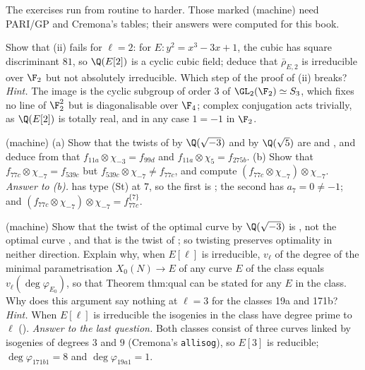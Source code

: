 The exercises run from routine to harder. Those marked (machine) need PARI/GP and Cremona's tables; their answers were computed for this book.

\begin{exercise}[$\ell=2$]\label{exer:modgalrep:l-two}
Show that (ii) fails for $\ell=2$: for $E\colon y^2=x^3-3x+1$, the cubic has square discriminant $81$, so $\Q(E[2])$ is a cyclic cubic field; deduce that
$\bar\rho_{E,2}$ is irreducible over $\F_2$ but not absolutely irreducible. Which step of the proof of (ii) breaks?
\emph{Hint.} The image is the cyclic subgroup of order $3$ of $\GL_2(\F_2)\simeq S_3$, which fixes no line of $\F_2^2$ but is diagonalisable over $\F_4$; complex conjugation acts
trivially, as $\Q(E[2])$ is totally real, and in any case $1=-1$ in $\F_2$.
\end{exercise}

\begin{exercise}\label{exer:modgalrep:naive-newform}
(machine) (a) Show that the twists of  by $\Q(\sqrt{-3})$ and by $\Q(\sqrt5)$ are  and , and deduce from  that $f_{11a}\otimes\chi_{-3}=f_{99d}$ and
$f_{11a}\otimes\chi_5=f_{275b}$. (b) Show that $f_{77c}\otimes\chi_{-7}=f_{539c}$ but $f_{539c}\otimes\chi_{-7}\ne f_{77c}$, and compute $(f_{77c}\otimes\chi_{-7})\otimes\chi_{-7}$.
\emph{Answer to (b).}  has type (St) at $7$, so the first is ; the second has $a_7=0\ne-1$; and $(f_{77c}\otimes\chi_{-7})\otimes\chi_{-7}=f_{77c}^{\{7\}}$.
\end{exercise}

\begin{exercise}\label{exer:modgalrep:twist-optimal}
(machine) Show that the twist of the optimal curve  by $\Q(\sqrt{-3})$ is , not the optimal curve , and that  is the twist of
; so twisting preserves optimality in neither direction. Explain why, when $E[\ell]$ is irreducible, $v_\ell$ of the degree of the minimal parametrisation
$X_0(N)\to E$ of any curve $E$ of the class equals $v_\ell(\deg\varphi_{E_0})$, so that Theorem thm:qual can be stated for any $E$ in the class. Why does this argument say
nothing at $\ell=3$ for the classes 19a and 171b? \emph{Hint.} When $E[\ell]$ is irreducible the isogenies in the class have degree prime to $\ell$ ().
\emph{Answer to the last question.} Both classes consist of three curves linked by isogenies of degrees $3$ and $9$ (Cremona's \texttt{allisog}), so $E[3]$ is
reducible; $\deg\varphi_{171b1}=8$ and $\deg\varphi_{19a1}=1$.
\end{exercise}

